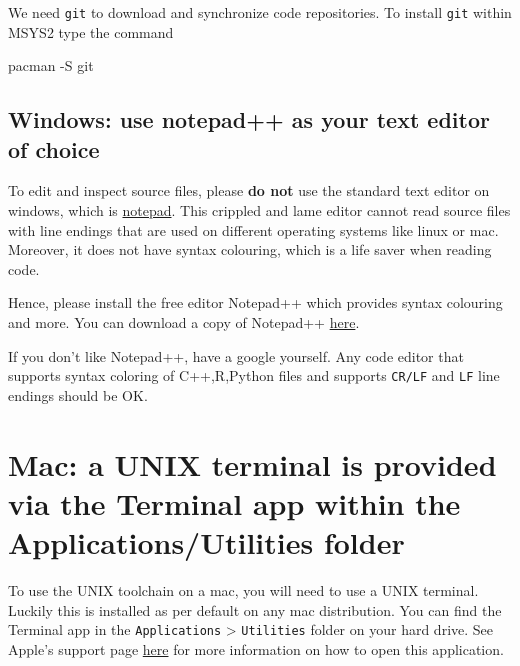 \documentclass[
]{book}
\newenvironment{Shaded}{\begin{snugshade}}{\end{snugshade}}
\newcommand{\AttributeTok}[1]{\textcolor[rgb]{0.77,0.63,0.00}{#1}}
\newcommand{\ExtensionTok}[1]{#1}
\newcommand{\NormalTok}[1]{#1}
\begin{document}
We need \texttt{git} to download and synchronize code repositories. To install \texttt{git} within MSYS2 type the command

\begin{Shaded}
\begin{Highlighting}[]
\ExtensionTok{pacman} \AttributeTok{{-}S}\NormalTok{ git}
\end{Highlighting}
\end{Shaded}

\hypertarget{windows-use-notepad-as-your-text-editor-of-choice}{%
\subsection{Windows: use notepad++ as your text editor of choice}\label{windows-use-notepad-as-your-text-editor-of-choice}}

To edit and inspect source files, please \textbf{do not} use the standard text editor on windows, which is \href{https://apps.microsoft.com/store/detail/windows-notepad/9MSMLRH6LZF3?hl=en-us\&gl=US}{notepad}. This crippled and lame editor cannot read source files with line endings that are used on different operating systems like linux or mac. Moreover, it does not have syntax colouring, which is a life saver when reading code.

Hence, please install the free editor Notepad++ which provides syntax colouring and more.
You can download a copy of Notepad++ \href{https://notepad-plus-plus.org/downloads/}{here}.

If you don't like Notepad++, have a google yourself. Any code editor that supports syntax coloring of C++,R,Python files and supports \texttt{CR/LF} and \texttt{LF} line endings should be OK.

\hypertarget{mac-a-unix-terminal-is-provided-via-the-terminal-app-within-the-applicationsutilities-folder}{%
\section{Mac: a UNIX terminal is provided via the Terminal app within the Applications/Utilities folder}\label{mac-a-unix-terminal-is-provided-via-the-terminal-app-within-the-applicationsutilities-folder}}

To use the UNIX toolchain on a mac, you will need to use a UNIX terminal. Luckily this is installed as per default on any mac distribution. You can find the Terminal app in the \texttt{Applications} \textgreater{} \texttt{Utilities} folder on your hard drive. See Apple's support page \href{https://support.apple.com/en-gb/guide/terminal/apd5265185d-f365-44cb-8b09-71a064a42125/mac}{here} for more information on how to open this application.
\end{document}
